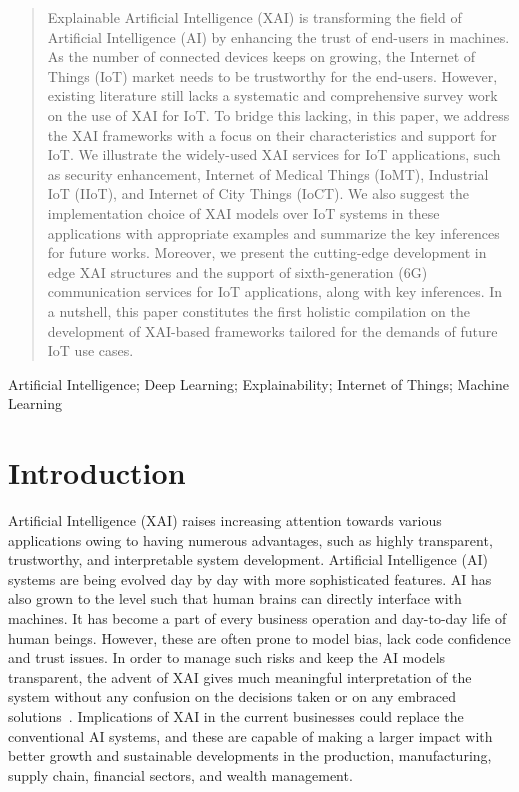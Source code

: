 \documentclass[journal]{IEEEtran}
\begin{document}
\maketitle
\begin{abstract}
Explainable Artificial Intelligence (XAI) is transforming the field of Artificial Intelligence (AI) by enhancing the trust of end-users in machines. As the number of connected devices keeps on growing, the Internet of Things (IoT) market needs to be trustworthy for the end-users. However, existing literature still lacks a systematic and comprehensive survey work on the use of XAI for IoT. To bridge this lacking, in this paper, we address the XAI frameworks with a focus on their characteristics and support for IoT. We illustrate the widely-used XAI services for IoT applications, such as security enhancement, Internet of Medical Things (IoMT), Industrial IoT (IIoT), and Internet of City Things (IoCT). We also suggest the implementation choice of XAI models over IoT systems in these applications with appropriate examples and summarize the key inferences for future works. Moreover, we present the cutting-edge development in edge XAI structures and the support of sixth-generation (6G) communication services for IoT applications, along with key inferences. In a nutshell, this paper constitutes the first holistic compilation on the development of XAI-based frameworks tailored for the demands of future IoT use cases.
\end{abstract}
\begin{IEEEkeywords}
Artificial Intelligence; Deep Learning; Explainability; Internet of Things; Machine Learning
\end{IEEEkeywords}
\IEEEpeerreviewmaketitle
\section{Introduction}
 Artificial Intelligence (XAI) raises increasing attention towards various applications owing to having numerous advantages, such as highly transparent, trustworthy, and interpretable system development. 
Artificial Intelligence (AI) systems are being evolved day by day with more sophisticated features. AI has also grown to the level such that human brains can directly interface with machines. It has become a part of every business operation and day-to-day life of human beings. However, these are often prone to model bias, lack code confidence and trust issues. In order to manage such risks and keep the AI models transparent, the advent of XAI gives much meaningful interpretation of the system without any confusion on the decisions taken or on any embraced solutions~\cite{mohseni2021multidisciplinary}. Implications of XAI in the current businesses could replace the conventional AI systems, and these are capable of making a larger impact with better growth and sustainable developments in the production, manufacturing, supply chain, financial sectors, and wealth management.
\end{document}
